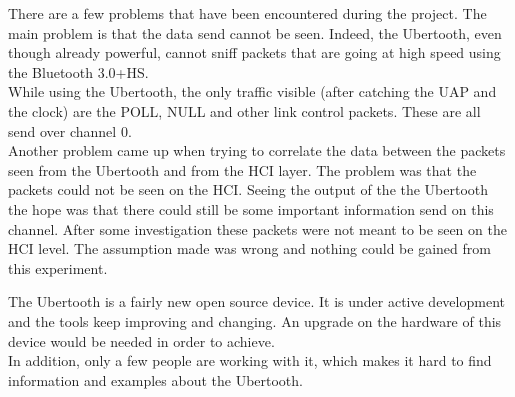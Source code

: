 \label{subsec:problems}
There are a few problems that have been encountered during the project. 
The main problem is that the data send cannot be seen. Indeed, the Ubertooth, even though already powerful, cannot sniff packets that are going at high speed using the Bluetooth 3.0+HS. \\
While using the Ubertooth, the only traffic visible (after catching the UAP and the clock) are the POLL, NULL and other link control packets. These are all send over channel 0.\\

Another problem came up when trying to correlate the data between the packets seen from the Ubertooth and from the HCI layer. The problem was that the packets could not be seen on the HCI. Seeing the output of the the Ubertooth the hope was that there could still be some important information send on this channel. After some investigation these packets were not meant to be seen on the HCI level. The assumption made was wrong and nothing could be gained from this experiment.

The Ubertooth is a fairly new open source device. It is under active development and the tools keep improving and changing. An upgrade on the hardware of this device would be needed in order to achieve. \\
In addition, only a few people are working with it, which makes it hard to find information and examples about the Ubertooth.
